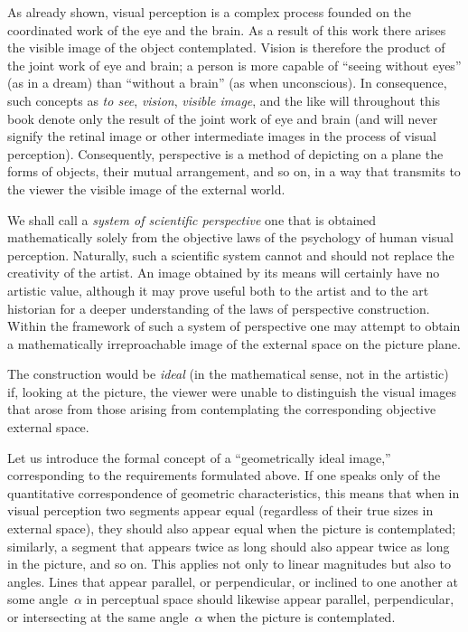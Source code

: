 As already shown, visual perception is a complex process founded on the coordinated
work of the eye and the brain.  As a result of this work there arises the visible image of
the object contemplated.  Vision is therefore the product of the joint work of eye and
brain; a person is more capable of ``seeing without eyes'' (as in a dream) than ``without
a brain'' (as when unconscious).  In consequence, such concepts as \emph{to see},
\emph{vision}, \emph{visible image}, and the like will throughout this book denote only
the result of the joint work of eye and brain (and will never signify the retinal image
or other intermediate images in the process of visual perception).  Consequently,
perspective is a method of depicting on a plane the forms of objects, their mutual
arrangement, and so on, in a way that transmits to the viewer the visible image of the
external world.


We shall call a \emph{system of scientific perspective} one that is obtained
mathematically solely from the objective laws of the psychology of human visual
perception.  Naturally, such a scientific system cannot and should not replace the
creativity of the artist.  An image obtained by its means will certainly have no artistic
value, although it may prove useful both to the artist and to the art historian for a deeper
understanding of the laws of perspective construction.  Within the framework of such a
system of perspective one may attempt to obtain a mathematically irreproachable image
of the external space on the picture plane.

The construction would be \emph{ideal} (in the mathematical sense, not in the artistic)
if, looking at the picture, the viewer were unable to distinguish the visual images that
arose from those arising from contemplating the corresponding objective external space.

Let us introduce the formal concept of a ``geometrically ideal image,'' corresponding to
the requirements formulated above.  If one speaks only of the quantitative correspondence
of geometric characteristics, this means that when in visual perception two segments
appear equal (regardless of their true sizes in external space), they should also appear
equal when the picture is contemplated; similarly, a segment that appears twice as long
should also appear twice as long in the picture, and so on.  This applies not only to
linear magnitudes but also to angles.  Lines that appear parallel, or perpendicular, or
inclined to one another at some angle~$\alpha$ in perceptual space should likewise appear
parallel, perpendicular, or intersecting at the same angle~$\alpha$ when the picture is
contemplated.

